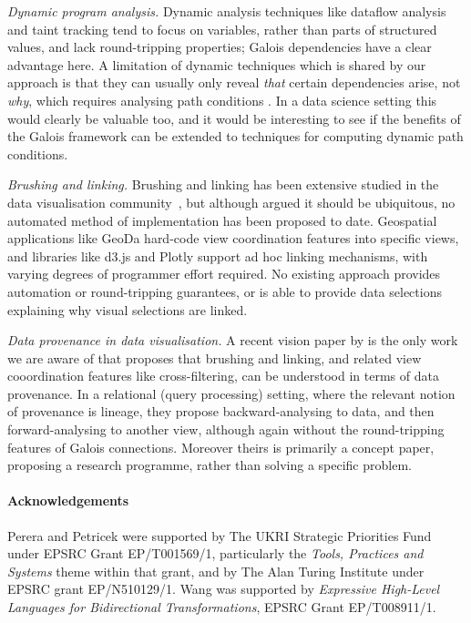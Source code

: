 \emph{Dynamic program analysis.} Dynamic analysis techniques like dataflow analysis \cite{chen88} and taint tracking \cite{reps95} tend to focus on variables, rather than parts of structured values, and lack round-tripping properties; Galois dependencies have a clear advantage here. A limitation of dynamic techniques which is shared by our approach is that they can usually only reveal \emph{that} certain dependencies arise, not \emph{why}, which requires analysing path conditions \cite{hammer06}. In a data science setting this would clearly be valuable too, and it would be interesting to see if the benefits of the Galois framework can be extended to techniques for computing dynamic path conditions.

\emph{Brushing and linking.} Brushing and linking has been extensive studied in the data visualisation community~\cite{mcdonald82,becker87}, but although \citet{roberts06} argued it should be ubiquitous, no automated method of implementation has been proposed to date. Geospatial applications like GeoDa \cite{anselin06} hard-code view coordination features into specific views, and libraries like d3.js and Plotly support ad hoc linking mechanisms, with varying degrees of programmer effort required. No existing approach provides automation or round-tripping guarantees, or is able to provide data selections explaining why visual selections are linked.

\emph{Data provenance in data visualisation.} A recent vision paper by \citet{psallidas18} is the only work we are aware of that proposes that brushing and linking, and related view cooordination features like cross-filtering, can be understood in terms of data provenance. In a relational (query processing) setting, where the relevant notion of provenance is lineage, they propose backward-analysing to data, and then forward-analysing to another view, although again without the round-tripping features of Galois connections. Moreover theirs is primarily a concept paper, proposing a research programme, rather than solving a specific problem.

\paragraph{Acknowledgements}

Perera and Petricek were supported by The UKRI Strategic Priorities Fund under EPSRC Grant EP/T001569/1, particularly the \emph{Tools, Practices and Systems} theme within that grant, and by The Alan Turing Institute under EPSRC grant EP/N510129/1. Wang was supported by \emph{Expressive High-Level Languages for Bidirectional Transformations}, EPSRC Grant EP/T008911/1.